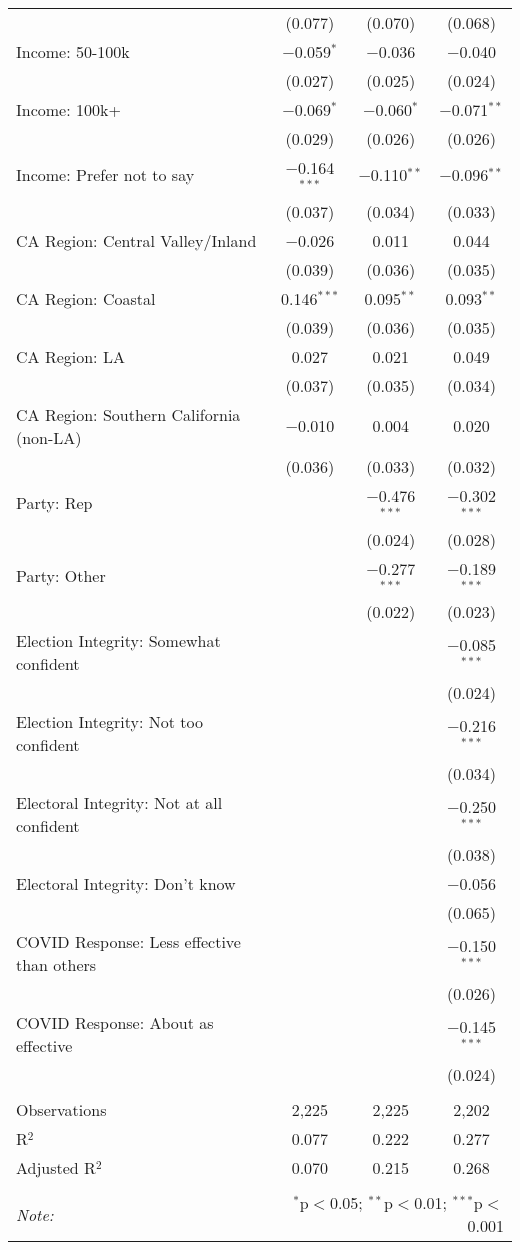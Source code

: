 \begin{table}[!htbp]
\begin{tabular}{@{\extracolsep{5pt}}lccc}
  & (0.077) & (0.070) & (0.068) \\ 
  Income: 50-100k & $-$0.059$^{*}$ & $-$0.036 & $-$0.040 \\ 
  & (0.027) & (0.025) & (0.024) \\ 
  Income: 100k+ & $-$0.069$^{*}$ & $-$0.060$^{*}$ & $-$0.071$^{**}$ \\ 
  & (0.029) & (0.026) & (0.026) \\ 
  Income: Prefer not to say & $-$0.164$^{***}$ & $-$0.110$^{**}$ & $-$0.096$^{**}$ \\ 
  & (0.037) & (0.034) & (0.033) \\ 
  CA Region: Central Valley/Inland & $-$0.026 & 0.011 & 0.044 \\ 
  & (0.039) & (0.036) & (0.035) \\ 
  CA Region: Coastal & 0.146$^{***}$ & 0.095$^{**}$ & 0.093$^{**}$ \\ 
  & (0.039) & (0.036) & (0.035) \\ 
  CA Region: LA & 0.027 & 0.021 & 0.049 \\ 
  & (0.037) & (0.035) & (0.034) \\ 
  CA Region: Southern California (non-LA) & $-$0.010 & 0.004 & 0.020 \\ 
  & (0.036) & (0.033) & (0.032) \\ 
  Party: Rep &  & $-$0.476$^{***}$ & $-$0.302$^{***}$ \\ 
  &  & (0.024) & (0.028) \\ 
  Party: Other &  & $-$0.277$^{***}$ & $-$0.189$^{***}$ \\ 
  &  & (0.022) & (0.023) \\ 
  Election Integrity: Somewhat confident &  &  & $-$0.085$^{***}$ \\ 
  &  &  & (0.024) \\ 
  Election Integrity: Not too confident &  &  & $-$0.216$^{***}$ \\ 
  &  &  & (0.034) \\ 
  Electoral Integrity: Not at all confident &  &  & $-$0.250$^{***}$ \\ 
  &  &  & (0.038) \\ 
  Electoral Integrity: Don't know &  &  & $-$0.056 \\ 
  &  &  & (0.065) \\ 
  COVID Response: Less effective than others &  &  & $-$0.150$^{***}$ \\ 
  &  &  & (0.026) \\ 
  COVID Response: About as effective &  &  & $-$0.145$^{***}$ \\ 
  &  &  & (0.024) \\ 
 \hline \\[-1.8ex] 
Observations & 2,225 & 2,225 & 2,202 \\ 
R$^{2}$ & 0.077 & 0.222 & 0.277 \\ 
Adjusted R$^{2}$ & 0.070 & 0.215 & 0.268 \\ 
\hline 
\hline \\[-1.8ex] 
\textit{Note:}  & \multicolumn{3}{r}{$^{*}$p$<$0.05; $^{**}$p$<$0.01; $^{***}$p$<$0.001} \\ 
\end{tabular} 
\end{table} 
